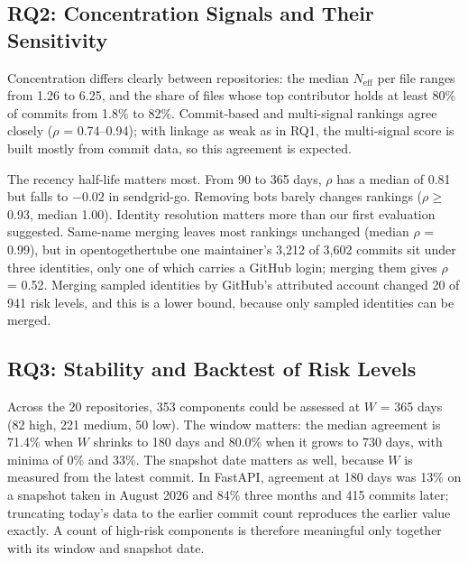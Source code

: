 \documentclass[conference]{IEEEtran}
\newcommand{\res}[1]{#1}
\begin{document}
\subsection{RQ2: Concentration Signals and Their Sensitivity}
Concentration differs clearly between repositories: the median $N_{\mathrm{eff}}$ per file ranges from \res{1.26} to \res{6.25}, and the share of files whose top contributor holds at least 80\% of commits from \res{1.8\%} to \res{82\%}. Commit-based and multi-signal rankings agree closely ($\rho$ = \res{0.74--0.94}); with linkage as weak as in RQ1, the multi-signal score is built mostly from commit data, so this agreement is expected.

The recency half-life matters most. From 90 to 365 days, $\rho$ has a median of \res{0.81} but falls to \res{$-0.02$} in sendgrid-go. Removing bots barely changes rankings ($\rho \geq$ \res{0.93}, median \res{1.00}). Identity resolution matters more than our first evaluation suggested. Same-name merging leaves most rankings unchanged (median $\rho$ = \res{0.99}), but in opentogethertube one maintainer's \res{3{,}212} of \res{3{,}602} commits sit under three identities, only one of which carries a GitHub login; merging them gives $\rho$ = \res{0.52}. Merging sampled identities by GitHub's attributed account changed \res{20} of \res{941} risk levels, and this is a lower bound, because only sampled identities can be merged.

\subsection{RQ3: Stability and Backtest of Risk Levels}
Across the \res{20} repositories, \res{353} components could be assessed at $W$ = 365 days (\res{82} high, \res{221} medium, \res{50} low). The window matters: the median agreement is \res{71.4\%} when $W$ shrinks to 180 days and \res{80.0\%} when it grows to 730 days, with minima of \res{0\%} and \res{33\%}. The snapshot date matters as well, because $W$ is measured from the latest commit. In FastAPI, agreement at 180 days was \res{13\%} on a snapshot taken in August 2026 and \res{84\%} three months and \res{415} commits later; truncating today's data to the earlier commit count reproduces the earlier value exactly. A count of high-risk components is therefore meaningful only together with its window and snapshot date.
\end{document}
